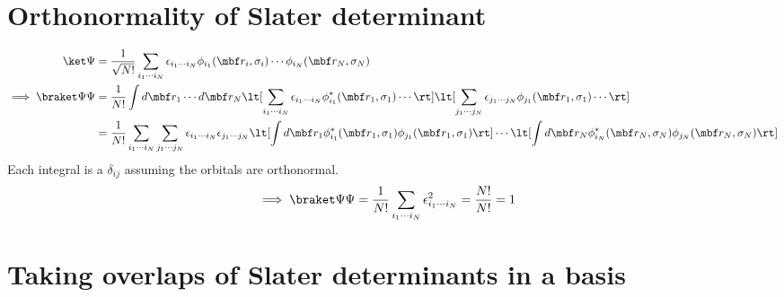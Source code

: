 \documentclass[10pt]{article}
\begin{document}
\section{\label{sec:slnorm} Orthonormality of Slater determinant}
  \begin{align*}
    \ket \Psi
    &=
    \frac{1}{\sqrt{N!}} 
    \sum_{i_1\cdots i_N} \epsilon_{i_1 \cdots i_N}
    \phi_{i_1}(\mbf r_i,\sigma_i)
    \cdots
    \phi_{i_N}(\mbf r_N,\sigma_N) \\
    \implies
    \braket \Psi \Psi
    &=
    \frac1{N!} \int d\mbf r_1 \cdots d\mbf r_N
    \lt[\sum_{i_1\cdots i_N} \epsilon_{i_1 \cdots i_N} 
    \phi_{i_1}^*(\mbf r_1,\sigma_1) \cdots \rt]
    \lt[\sum_{j_1\cdots j_N} \epsilon_{j_1 \cdots j_N} 
    \phi_{j_1}(\mbf r_1,\sigma_1)   \cdots \rt] \\
    &=
    \frac 1{N!} \sum_{i_1\cdots i_N} \sum_{j_1\cdots j_N}
    \epsilon_{i_1 \cdots i_N}  \epsilon_{j_1 \cdots j_N}  
    \lt[\int d\mbf r_1 \phi_{i_1}^*(\mbf r_1,\sigma_1) \phi_{j_1}(\mbf r_1,\sigma_1)\rt]
    \cdots
    \lt[\int d\mbf r_N \phi_{i_N}^*(\mbf r_N,\sigma_N) \phi_{j_N}(\mbf r_N,\sigma_N)\rt]
  \end{align*} 
  Each integral is a $\delta_{ij}$ assuming the orbitals are orthonormal.
  \begin{align*} 
    \implies
    \braket \Psi \Psi
    &=
    \frac{1}{N!} \sum_{i_1 \cdots i_N} \epsilon_{i_1 \cdots i_N}^2
    =
    \frac{N!}{N!} = 1
  \end{align*} 

\section{\label{sec:overlap} Taking overlaps of Slater determinants in a basis}
\end{document}
